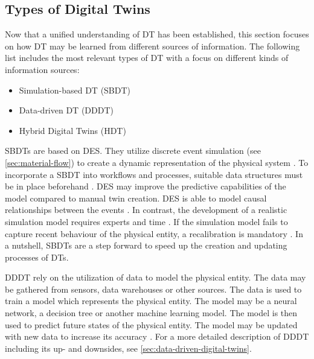 \subsection{Types of Digital Twins}
\label{sec:types-digital-twins}
Now that a unified understanding of DT has been established, this section focuses on how DT may be learned from different sources of information. The following list includes the most relevant types of DT with a focus on different kinds of information sources:

\begin{itemize}
  \item Simulation-based DT (SBDT) \parencite{Lugaresi2021aifac,martinez2018automatic}
  \item Data-driven DT (DDDT) \parencite{he2019data,Friederich2022}
  \item Hybrid Digital Twins (HDT) \parencite{luo2020hybrid,huang2023hybrid}
\end{itemize}


SBDTs \parencite{Lugaresi2021aifac,martinez2018automatic,boschert2016digital} are based on DES. They utilize discrete event simulation (see \autoref{sec:material-flow}) to create a dynamic representation of the physical system \parencite{schluse2016simulation,pantelides2013online}. To incorporate a SBDT into workflows and processes, suitable data structures must be in place beforehand \parencite{boschert2016digital}. DES may improve the predictive capabilities of the model compared to manual twin creation. DES is able to model causal relationships between the events \parencite{francis2021towards}. In contrast, the development of a realistic simulation model requires experts and time \parencite{Charpentier2014}. If the simulation model fails to capture recent behaviour of the physical entity, a recalibration is mandatory \parencite{Friederich2022}. In a nutshell, SBDTs are a step forward to speed up the creation and updating processes of DTs.

DDDT rely on the utilization of data to model the physical entity. The data may be gathered from sensors, data warehouses or other sources. The data is used to train a model which represents the physical entity. The model may be a neural network, a decision tree or another machine learning model. The model is then used to predict future states of the physical entity. The model may be updated with new data to increase its accuracy \parencite{he2019data,Friederich2022}. For a more detailed description of DDDT including its up- and downsides, see \autoref{sec:data-driven-digital-twins}.

